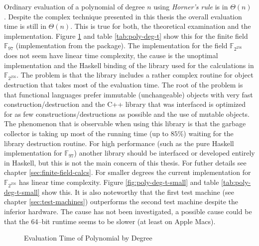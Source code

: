 Ordinary evaluation of a polynomial of degree $n$ using \emph{Horner's rule} is
in $\Theta(n)$ \cite{cormen01}. Despite the complex technique presented in this
thesis the overall evaluation time is still in $\Theta(n)$. This is true for
both, the theoretical examination and the implementation. Figure
\ref{fig:poly-deg-t} and table \ref{tab:poly-deg-t} show this for the finite
field $\mathbb{F}_{97}$ (implementation from the \JWTLhaskellForMaths{}
package). The implementation for the field $\mathbb{F}_{2^{256}}$ does not seem
have linear time complexity, the cause is the unoptimal implementation and the
Haskell binding of the library used for the calculations in
$\mathbb{F}_{2^{256}}$. The problem is that the library includes a rather
complex routine for object destruction that takes most of the evaluation time.
The root of the problem is that functional languages prefer immutable
(unchangeable) objects with very fast construction/destruction and the C++
library that was interfaced is optimized for as few constructions/destructions
as possible and the use of mutable objects. The phenomenon that is observable
when using this library is that the garbage collector is taking up most of the
running time (up to $85\%$) waiting for the library destruction routine. For
high performance (such as the pure Haskell implementation for $\mathbb{F}_{97}$)
another library should be interfaced or developed entirely in Haskell, but this
is not the main concern of this thesis. For futher details see chapter
\ref{sec:finite-field-calcs}. For smaller degrees the current implementation for
$\mathbb{F}_{2^{256}}$ has linear time complexity. Figure
\ref{fig:poly-deg-t-small} and table \ref{tab:poly-deg-t-small} show
this. It is also noteworthy that the first test machine (see chapter
\ref{sec:test-machines}) outperforms the second test machine despite the
inferior hardware. The cause has not been investigated, a possible cause could
be that the 64--bit \JWTghc{} runtime seems to be slower (at least on Apple
Macs)\cite{lentczner11}.


\begin{figure}[ht]
  \centering
  
  \caption{Evaluation Time of Polynomial by Degree}
  \label{fig:poly-deg-t}
\end{figure}

